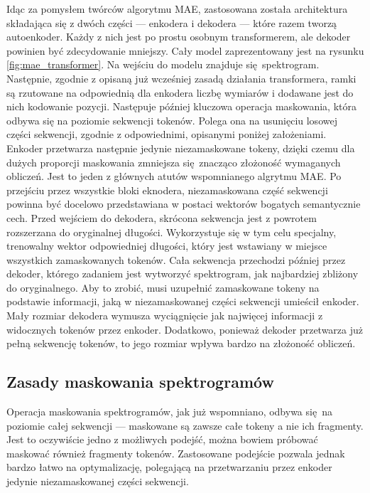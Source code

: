 Idąc za pomysłem twórców algorytmu MAE, zastosowana została architektura składająca się z dwóch
części --- enkodera i dekodera --- które razem tworzą autoenkoder. Każdy z nich jest po prostu
osobnym transformerem, ale dekoder powinien być zdecydowanie mniejszy. Cały model zaprezentowany
jest na rysunku \ref{fig:mae_transformer}. Na wejściu do modelu znajduje się spektrogram. Następnie,
zgodnie z opisaną już wcześniej zasadą działania transformera, ramki są rzutowane na odpowiednią dla
enkodera liczbę wymiarów i dodawane jest do nich kodowanie pozycji. Następuje później kluczowa
operacja maskowania, która odbywa się na poziomie sekwencji tokenów. Polega ona na usunięciu losowej
części sekwencji, zgodnie z odpowiednimi, opisanymi poniżej założeniami. Enkoder przetwarza
następnie jedynie niezamaskowane tokeny, dzięki czemu dla dużych proporcji maskowania zmniejsza
się znacząco złożoność wymaganych obliczeń. Jest to jeden z głównych atutów wspomnianego algrytmu
MAE. Po przejściu przez wszystkie bloki eknodera, niezamaskowana część sekwencji powinna być
docelowo przedstawiana w postaci wektorów bogatych semantycznie cech. Przed wejściem do dekodera,
skrócona sekwencja jest z powrotem rozszerzana do oryginalnej długości. Wykorzystuje się w tym celu
specjalny, trenowalny wektor odpowiedniej długości, który jest wstawiany w miejsce wszystkich
zamaskowanych tokenów. Cała sekwencja przechodzi później przez dekoder, którego zadaniem jest
wytworzyć spektrogram, jak najbardziej zbliżony do oryginalnego. Aby to zrobić, musi uzupełnić
zamaskowane tokeny na podstawie informacji, jaką w niezamaskowanej części sekwencji umieścił
enkoder. Mały rozmiar dekodera wymusza wyciągnięcie jak najwięcej informacji z widocznych tokenów
przez enkoder. Dodatkowo, ponieważ dekoder przetwarza już pełną sekwencję tokenów, to jego rozmiar
wpływa bardzo na złożoność obliczeń.

\subsection{Zasady maskowania spektrogramów}

Operacja maskowania spektrogramów, jak już wspomniano, odbywa się na poziomie całej sekwencji ---
maskowane są zawsze całe tokeny a nie ich fragmenty. Jest to oczywiście jedno z możliwych podejść,
można bowiem próbować maskować również fragmenty tokenów. Zastosowane podejście pozwala jednak
bardzo łatwo na optymalizację, polegającą na przetwarzaniu przez enkoder jedynie niezamaskowanej
części sekwencji.

